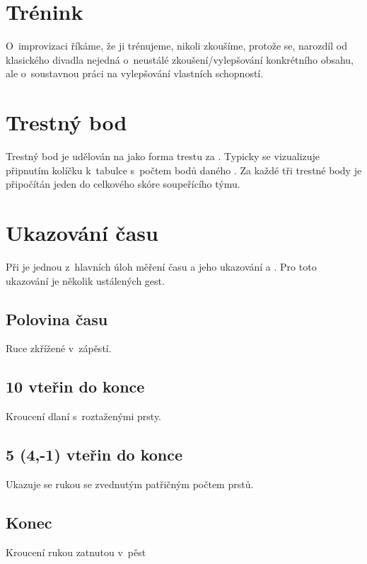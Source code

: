  
\needspace{5cm} \section{Trénink} \label{trénink} O~improvizaci říkáme, že ji trénujeme, nikoli zkoušíme, protože se, narozdíl od klasického divadla 
nejedná o~neustálé zkoušení/vylepšování konkrétního obsahu, ale 
o~soustavnou práci na vylepšování vlastních schopností.  
 
\needspace{5cm} \section{Trestný bod} \label{trestný bod} Trestný bod je udělován na  jako forma trestu za . Typicky se vizualizuje připnutím kolíčku k~tabulce s~počtem bodů daného . Za každé tři trestné body je připočítán jeden  do celkového skóre soupeřícího týmu. 
 
 
\needspace{5cm} \section{Ukazování času} \label{ukazování času} Při  je jednou z~hlavních úloh  měření času a jeho ukazování  a . 
Pro toto ukazování je několik ustálených gest.  
 
 
 
\subsection{Polovina času} Ruce zkřížené v~zápěstí. 
 
\subsection{10 vteřin do konce} Kroucení dlaní s~roztaženými prsty. 
 
\subsection{5 (4,-1) vteřin do konce} Ukazuje se rukou se zvednutým patřičným počtem prstů. 
 
\subsection{Konec} Kroucení rukou zatnutou v~pěst 
 
